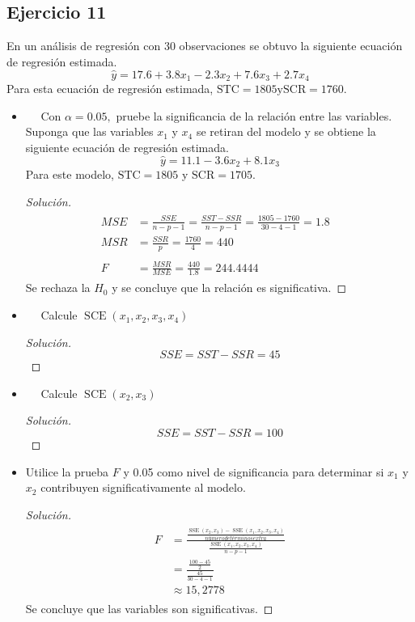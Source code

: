 \documentclass[a4paper,12pt]{article}
\newenvironment{solution}
  {\renewcommand\qedsymbol{$\blacksquare$}\begin{proof}[Solución]}
  {\end{proof}}
\begin{document}
\subsection{Ejercicio 11}
En un análisis de regresión con 30 observaciones se obtuvo la siguiente ecuación de regresión estimada.
$$
\hat{y}=17.6+3.8 x_{1}-2.3 x_{2}+7.6 x_{3}+2.7 x_{4}
$$
Para esta ecuación de regresión estimada, $\mathrm{STC}=1805 \mathrm{y} \mathrm{SCR}=1760 .$
\begin{itemize}
   
\item  $\quad$ Con $\alpha=0.05,$ pruebe la significancia de la relación entre las variables. Suponga que las variables $x_{1}$ y $x_{4}$ se retiran del modelo y se obtiene la siguiente ecuación de regresión estimada.
$$
\hat{y}=11.1-3.6 x_{2}+8.1 x_{3}
$$
Para este modelo, $\mathrm{STC}=1805$ y $ \mathrm{SCR}=1705 .$

\begin{solution}
\begin{align}
\begin{aligned}
M S E &=\frac{S S E}{n-p-1} =\frac{S S T-S S R}{n-p-1} =\frac{1805-1760}{30-4-1} =1.8 
& \\
M S R &=\frac{S S R}{p} 
=\frac{1760}{4} 
=440 \\
& \\
F&=\frac{M S R}{M S E} 
=\frac{440}{1.8}
=244.4444
\end{aligned}
\end{align}
Se rechaza la $H_0$ y se concluye que la relación es significativa.
\end{solution}
\item  $\quad$ Calcule $\operatorname{SCE}\left(x_{1}, x_{2}, x_{3}, x_{4}\right)$
\begin{solution}
$$SSE= SST-SSR = 45$$
\end{solution}
\item  $\quad$ Calcule $\operatorname{SCE}\left(x_{2}, x_{3}\right)$

\begin{solution}
$$SSE= SST-SSR = 100$$
\end{solution}
\item  Utilice la prueba $F$ y 0.05 como nivel de significancia para determinar si $x_{1}$ y $x_{2}$ contribuyen significativamente al modelo.
\begin{solution}
\begin{align}
\begin{aligned}
F &=\frac{\frac{\operatorname{SSE}\left(x_{2}, x_{3}\right)-\operatorname{SSE}\left(x_{1}, x_{2}, x_{3}, x_{4}\right)}{número de términos extra}}{\frac{\operatorname{SSE}\left(x_{1}, x_{2}, x_{3}, x_{4}\right)}{n-p-1}} \\
&=\frac{\frac{100-45}{2}}{\frac{45}{30-4-1}} \\
& \approx 15,2778
\end{aligned}
\end{align}
Se concluye que las variables son significativas.
\end{solution}
\end{itemize}
\end{document}
